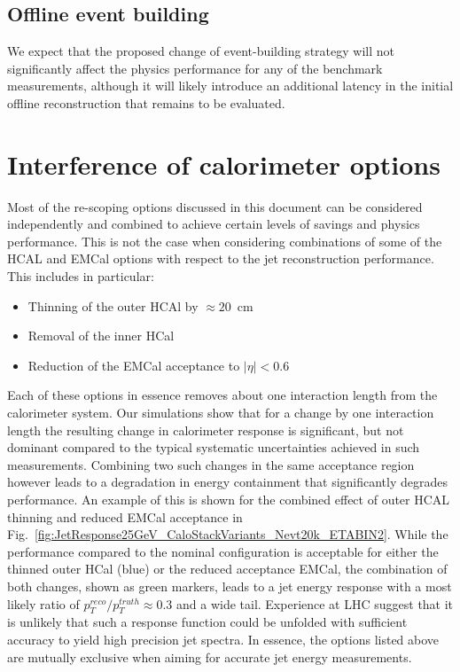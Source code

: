 \subsection{Offline event building}
We expect that the proposed change of event-building strategy will not significantly affect the physics performance for any of the benchmark measurements,
although it will likely introduce an additional latency in the initial offline reconstruction that remains to be evaluated.

\section{Interference of calorimeter options}
Most of the re-scoping options discussed in this document can be considered independently and combined to achieve certain levels of savings 
and physics performance. This is not the case when considering combinations of some of the HCAL and EMCal options with respect to the 
jet reconstruction performance. This includes in particular:
\begin{itemize}
\item Thinning of the outer HCAl by $\approx 20$~cm
\item Removal of the inner HCal
\item Reduction of the EMCal acceptance to $|\eta| < 0.6$
\end{itemize}
Each of these options in essence removes about one interaction length from the calorimeter system. Our simulations show that for a 
change by one interaction length the resulting change in calorimeter response is significant, but not dominant compared to the typical
systematic uncertainties achieved in such measurements. Combining two such changes in the same acceptance region however leads to 
a degradation in energy containment that significantly degrades performance. An example of this is shown for the combined effect of 
outer HCAL thinning and reduced EMCal acceptance in Fig.~\ref{fig:JetResponse25GeV_CaloStackVariants_Nevt20k_ETABIN2}. While the
performance compared to the nominal configuration is acceptable for either the thinned outer HCal (blue) or the reduced acceptance EMCal,
the combination of both changes, shown as green markers, leads to a jet energy response with a most likely ratio of $p_T^{reco}/p_T^{truth} 
\approx 0.3$ and a wide tail. Experience at LHC suggest that it is unlikely that such a response function could be unfolded with sufficient accuracy
to yield high precision jet spectra. In essence, the options listed above are mutually exclusive when aiming for accurate jet energy
measurements.

